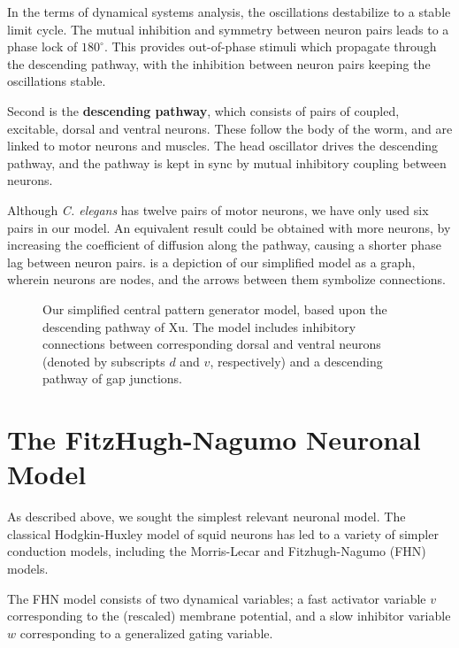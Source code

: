\documentclass[
    11pt,
]{article}
\begin{document}
In the terms of dynamical systems analysis, the oscillations destabilize to a stable limit cycle.  The mutual inhibition and symmetry between neuron pairs leads to a phase lock of $180^\circ$.  This provides out-of-phase stimuli which propagate through the descending pathway, with the inhibition between neuron pairs keeping the oscillations stable.

Second is the \textbf{descending pathway}, which consists of pairs of coupled, excitable, dorsal and ventral neurons.  These follow the body of the worm, and are linked to motor neurons and muscles. The head oscillator drives the descending pathway, and the pathway is kept in sync by mutual inhibitory coupling between neurons.

Although \emph{C. elegans} has twelve pairs of motor neurons, we have only used six pairs in our model.  An equivalent result could be obtained with more neurons, by increasing the coefficient of diffusion along the pathway, causing a shorter phase lag between neuron pairs.   is a depiction of our simplified model as a graph, wherein neurons are nodes, and the arrows between them symbolize connections.

\begin{figure}[h!]
    \ContinuedFloat
    \centering
    \caption{Our simplified central pattern generator model, based upon the descending pathway of Xu. The model includes inhibitory connections between corresponding dorsal and ventral neurons (denoted by subscripts $d$ and $v$, respectively) and a descending pathway of gap junctions.}
    \label{fig: cpg}
\end{figure} %

\section{The FitzHugh-Nagumo Neuronal Model}\label{sec: fhn}

As described above, we sought the simplest relevant neuronal model.  The classical Hodgkin-Huxley\cite{hodgkin1952} model of squid neurons has led to a variety of simpler conduction models, including the Morris-Lecar\cite{morris1981} and Fitzhugh-Nagumo (FHN) models.

The FHN model consists of two dynamical variables; a fast activator variable $v$ corresponding to the (rescaled) membrane potential, and a slow inhibitor variable $w$ corresponding to a generalized gating variable.
\end{document}
